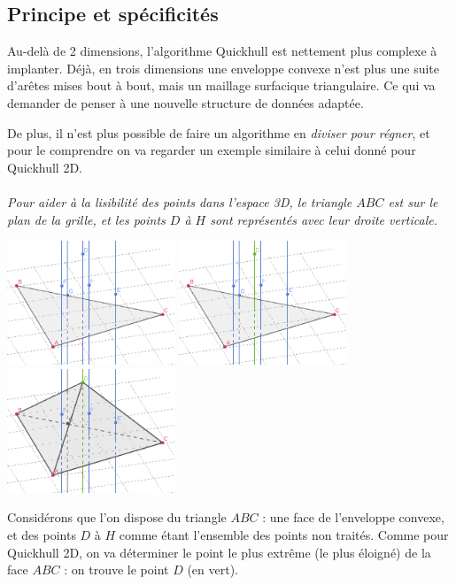 \documentclass[]{article}
\begin{document}
\subsection{Principe et spécificités}
Au-delà de 2 dimensions, l'algorithme Quickhull est nettement plus complexe à implanter. Déjà, en trois dimensions une enveloppe convexe n'est plus une suite d'arêtes mises bout à bout, mais un maillage surfacique triangulaire. Ce qui va demander de penser à une nouvelle structure de données adaptée.

De plus, il n'est plus possible de faire un algorithme en \emph{diviser pour régner}, et pour le comprendre on va regarder un exemple similaire à celui donné pour Quickhull 2D.

\paragraph{}
\emph{Pour aider à la lisibilité des points dans l'espace 3D, le triangle $ABC$ est sur le plan de la grille, et les points $D$ à $H$ sont représentés avec leur droite verticale.}

\includegraphics[width=5cm]{qh3d/geogebra-export3.png}
\includegraphics[width=5cm]{qh3d/geogebra-export4.png}
\includegraphics[width=5cm]{qh3d/geogebra-export5.png}

Considérons que l'on dispose du triangle $ABC$ : une face de l'enveloppe convexe, et des points $D$ à $H$ comme étant l'ensemble des points non traités. Comme pour Quickhull 2D, on va déterminer le point le plus extrême (le plus éloigné) de la face $ABC$ : on trouve le point $D$ (en vert).
\end{document}
